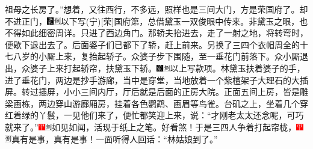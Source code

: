 祖母之长房了。''想着，又往西行，不多远，照样也是三间大门，方是荣国府了。却不进正门，{\includegraphics[width=3mm]{../Images/00006}\includegraphics[width=3mm]{../Images/00011}\footnotesize \kaishu 以下写{(宁)}{[}荣{]}国府第，总借黛玉一双俊眼中传来。非黛玉之眼，也不得如此细密周详。}只进了西边角门。那轿夫抬进去，走了一射之地，将转弯时，便歇下退出去了。后面婆子们已都下了轿，赶上前来。另换了三四个衣帽周全的十七八岁的小厮上来，复抬起轿子。众婆子步下围随，至一垂花门前落下。众小厮退出，众婆子上来打起轿帘，扶黛玉下轿。{\includegraphics[width=3mm]{../Images/00006}\includegraphics[width=3mm]{../Images/00011}\footnotesize \kaishu 以上写款项。}林黛玉扶着婆子的手，进了垂花门，两边是抄手游廊，当中是穿堂，当地放着一个紫檀架子大理石的大插屏。转过插屏，小小三间内厅，厅后就是后面的正房大院。正面五间上房，皆是雕梁画栋，两边穿山游廊厢房，挂着各色鹦鹉、画眉等鸟雀。台矶之上，坐着几个穿红着绿的丫鬟，一见他们来了，便忙都笑迎上来，说：``才刚老太太还念呢，可巧就来了。''{\includegraphics[width=3mm]{../Images/00002}\includegraphics[width=3mm]{../Images/00011}\footnotesize \kaishu 如见如闻，活现于纸上之笔。好看煞！}于是三四人争着打起帘栊，{\includegraphics[width=3mm]{../Images/00002}\includegraphics[width=3mm]{../Images/00011}\footnotesize \kaishu 真有是事，真有是事！}一面听得人回话：``林姑娘到了。''

